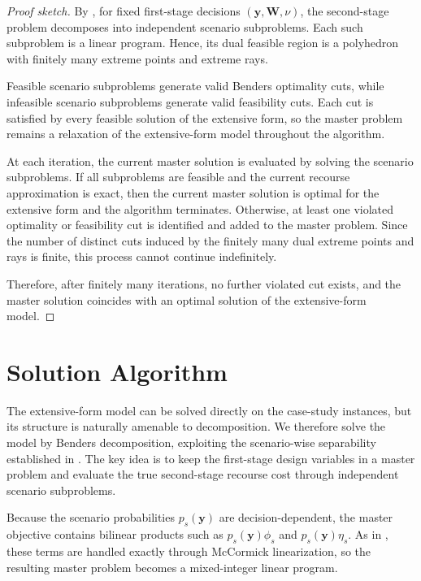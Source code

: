 \documentclass[final,3p,authoryear]{elsarticle}
\theoremstyle{definition}
\begin{document}
\begin{proof}[Proof sketch]
By , for fixed first-stage decisions
$(\mathbf{y},\mathbf{W},\nu)$, the second-stage problem decomposes into
independent scenario subproblems. Each such subproblem is a linear
program. Hence, its dual feasible region is a polyhedron with finitely
many extreme points and extreme rays.

Feasible scenario subproblems generate valid Benders optimality cuts,
while infeasible scenario subproblems generate valid feasibility cuts.
Each cut is satisfied by every feasible solution of the extensive form,
so the master problem remains a relaxation of the extensive-form model
throughout the algorithm.

At each iteration, the current master solution is evaluated by solving
the scenario subproblems. If all subproblems are feasible and the
current recourse approximation is exact, then the current master
solution is optimal for the extensive form and the algorithm terminates.
Otherwise, at least one violated optimality or feasibility cut is
identified and added to the master problem. Since the number of distinct
cuts induced by the finitely many dual extreme points and rays is finite,
this process cannot continue indefinitely.

Therefore, after finitely many iterations, no further violated cut
exists, and the master solution coincides with an optimal solution of
the extensive-form model.
\end{proof}


\section{Solution Algorithm}
\label{sec:algorithm}

The extensive-form model can be solved directly on the case-study
instances, but its structure is naturally amenable to decomposition.
We therefore solve the model by Benders decomposition, exploiting the
scenario-wise separability established in
. The key idea is to keep the first-stage design
variables in a master problem and evaluate the true second-stage
recourse cost through independent scenario subproblems.

Because the scenario probabilities $p_s(\mathbf y)$ are
decision-dependent, the master objective contains bilinear products such
as $p_s(\mathbf y)\phi_s$ and $p_s(\mathbf y)\eta_s$. As in
, these terms are handled exactly through
McCormick linearization, so the resulting master problem becomes a mixed-integer linear
program.
\end{document}
